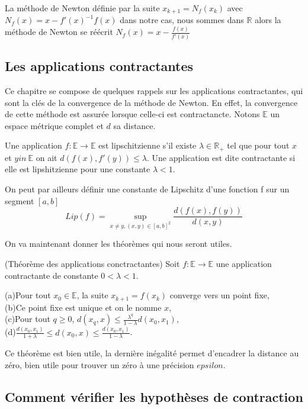 \documentclass[a4paper,10.5pt]{article}
\begin{document}
	La méthode de Newton définie par la suite $x_{k+1}=N_{f}(x_{k})$ avec $N_{f}(x)=x-f'(x)^{-1}f(x)$ dans notre cas, nous sommes dans $\mathbb{R}$ alors la méthode de Newton se réécrit $N_{f}(x)=x-\frac{f(x)}{f'(x)}$ 
	
	\subsection{Les applications contractantes}
	
	Ce chapitre se compose de quelques rappels sur les applications contractantes, qui sont la clés de la convergence de la méthode de Newton. En effet, la convergence de cette méthode est assurée lorsque celle-ci est contractancte. 
	Notons $\mathbb{E}$ un espace métrique complet et $d$ sa distance.
	
	
	\begin{definition} Une application $f: \mathbb{E} \rightarrow \mathbb{E}$ est lipschitzienne s'il existe $\lambda \in \mathbb{R}_{+}$ tel que pour tout $x$ et $y in\ \mathbb{E}$ on ait $d(f(x),f'(y)) \leq \lambda$. Une application est dite contractante si elle est lipshitzienne pour une constante $\lambda <1$. 
	\end{definition}
	On peut par ailleurs définir une constante de Lipschitz d'une fonction f sur un segment $[a,b]$
	\[Lip(f)=\sup_{x \neq y,(x,y)\in [a,b]^2} \frac{d(f(x),f(y))}{d(x,y)}\]
	
	On va maintenant donner les théorèmes qui nous seront utiles.
	\begin{theorem}(Théorème des applications conctractantes) Soit $f:\mathbb{E} \rightarrow \mathbb{E}$ une application contractante de constante $0<\lambda<1$.
		
		(a)Pour tout $x_0 \in \mathbb{E}$, la suite $x_{k+1}=f(x_k)$ converge vers un point fixe,\\
		
		(b)Ce point fixe est unique et on le nomme $x$,\\
		
		(c)Pour tout $q \geq 0$, $d(x_q,x) \leq \frac{\lambda^q}{1-\lambda} d(x_0,x_1)$,\\
		
		(d)$\frac{d(x_0,x_1)}{1+\lambda} \leq d(x_0,x) \leq \frac{d(x_0,x_1)}{1-\lambda}$.
	\end{theorem}
	Ce théorème est bien utile, la dernière inégalité permet d'encadrer la distance au zéro, bien utile pour trouver un zéro à une précision $epsilon$. 
	
	\subsection{Comment vérifier les hypothèses de contraction} 
	
\end{document}
